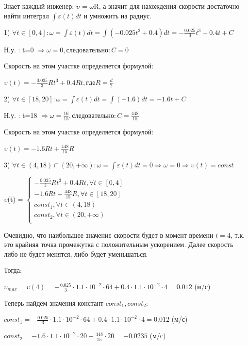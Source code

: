 \documentclass[a4paper, 12pt]{article}
\begin{document}
	Знает каждый инженер: $\upsilon$ = $\omega$R, а значит для нахождения скорости достаточно найти интеграл $\int\varepsilon(t)dt$ и умножить на радиус.
	\begin{center}
		1)  $\forall t \in [0,4]:  \omega = \int\varepsilon(t)dt = \int(-0.025t^2 + 0.4)dt = -\frac{0.025}{3}t^3 + 0.4t + C$
		
		Н.у. : t=0 $\Rightarrow \omega = 0, следовательно: C = 0$
		
		Скорость на этом участке определяется формулой:
		
		$\upsilon(t) = -\frac{0.025}{3}Rt^3 + 0.4Rt, где R = \frac{d}{2}$ 
	
		2) $\forall t \in [18, 20]: \omega = \int\varepsilon(t)dt = \int(-1.6)dt = -1.6t + C $
		
		Н.у. : t=18 $\Rightarrow \omega = \frac{16}{15}, следовательно: C = \frac{448}{15}$
		
		Скорость на этом участке определяется формулой:
		
		$\upsilon(t) = -1.6Rt + \frac{448}{15}R $
		
		3) $\forall t \in (4, 18) \cap (20, + \infty ): \omega = \int\varepsilon(t)dt = 0 \Rightarrow \omega = 0 \Rightarrow \upsilon(t) = const $
		
		$\upsilon$(t) = 
		$\begin{cases}
			-\frac{0.025}{3}Rt^3 + 0.4Rt, \forall t \in [0,4] \\
			-1.6Rt + \frac{448}{15}R, \forall t \in [18, 20] \\
			const_1, \forall t \in (4, 18) \\
			const_2, \forall t \in (20, + \infty ) \\
		\end{cases}$
		
	\end{center}
	
	Очевидно, что наибольшее значение скорости будет в момент времени $t = 4$, т.к. это крайняя точка промежутка с положительным ускорением. Далее скорость либо не будет менятся, либо будет уменьшаться. 
	
	Тогда:
	\begin{center}		
		$\upsilon_{max} = \upsilon(4) = -\frac{0.025}{3} \cdot 1.1 \cdot 10^{-2} \cdot 64 + 0.4 \cdot 1.1 \cdot 10^{-2} \cdot 4 = 0.012$ (м/с) 
	\end{center}
	
	Теперь найдём значения констант $const_1, const_2$:
	\begin{center}
		$const_1 = -\frac{0.025}{3} \cdot 1.1 \cdot 10^{-2} \cdot 64 + 0.4 \cdot 1.1 \cdot 10^{-2} \cdot 4 = 0.012$ (м/с) 
		
		$const_2 = -1.6 \cdot 1.1 \cdot 10^{-2} \cdot 20 + \frac{448}{15} \cdot 20 = -0.0235$ (м/с)
	\end{center}
	
\end{document}
